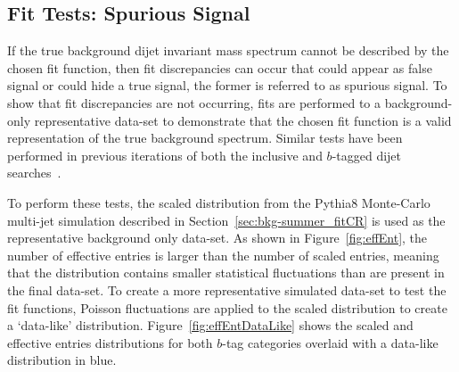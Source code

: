 \FloatBarrier
\subsection{Fit Tests: Spurious Signal}
\label{sec:bkg-summer_spusig}

If the true background dijet invariant mass spectrum cannot be described by the chosen fit function,
then fit discrepancies can occur that could appear as false signal or could hide a true signal,
the former is referred to as spurious signal.
To show that fit discrepancies are not occurring, fits are performed to a background-only representative data-set
to demonstrate that the chosen fit function is a valid representation of the true background spectrum.
Similar tests have been performed in previous iterations of both the inclusive and $b$-tagged dijet searches~\cite{dijet-mori16_paper,dibjet-mori16_paper}.

To perform these tests, the scaled distribution from the {\sc Pythia}8 Monte-Carlo multi-jet simulation
described in Section~\ref{sec:bkg-summer_fitCR}
is used as the representative background only data-set.
As shown in Figure~\ref{fig:effEnt},
the number of effective entries is larger than the number of scaled entries,
meaning that the distribution contains smaller statistical fluctuations than are present in the final data-set.
To create a more representative simulated data-set to test the fit functions,
Poisson fluctuations are applied to the scaled distribution to create a `data-like' distribution.
Figure~\ref{fig:effEntDataLike} shows the scaled and effective entries distributions for both
$b$-tag categories overlaid with a data-like distribution in blue.

